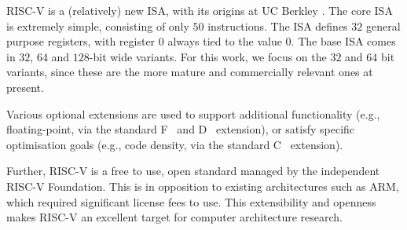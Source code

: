 
RISC-V is a (relatively) new ISA, with its origins at UC Berkley
\cite{riscv:1}.
The core ISA is extremely simple, consisting of only $50$ instructions.
The ISA defines $32$ general purpose registers, with register $0$ always
tied to the value $0$.
The base ISA comes in $32$, $64$ and $128$-bit wide variants.
For this work, we focus on the $32$ and $64$ bit variants, since these
are the more mature and commercially relevant ones at present.

Various optional extensions are used to 
support additional functionality 
(e.g., floating-point, 
       via the 
       standard F~\cite[Section 11]{RV:ISA:I:19}
                and
                D~\cite[Section 12]{RV:ISA:I:19}
       extension),
or satisfy specific optimisation goals
(e.g., code density, 
       via the 
       standard C~\cite[Section 16]{RV:ISA:I:19}
       extension).

Further, RISC-V is a free to use, open standard managed by the independent
RISC-V Foundation.
This is in opposition to existing architectures such as ARM, which required
significant license fees to use.
This extensibility and openness makes RISC-V an excellent target for
computer architecture research.


